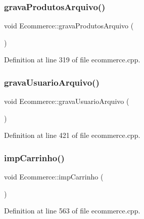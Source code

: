 \subsubsection{\texorpdfstring{grava\+Produtos\+Arquivo()}{gravaProdutosArquivo()}}
{\footnotesize\ttfamily void Ecommerce\+::grava\+Produtos\+Arquivo (\begin{DoxyParamCaption}{ }\end{DoxyParamCaption})}



Definition at line 319 of file ecommerce.\+cpp.

\mbox{\label{class_ecommerce_a5a0c013fa9ec62e5529e24286b8424cb}} 
\subsubsection{\texorpdfstring{grava\+Usuario\+Arquivo()}{gravaUsuarioArquivo()}}
{\footnotesize\ttfamily void Ecommerce\+::grava\+Usuario\+Arquivo (\begin{DoxyParamCaption}{ }\end{DoxyParamCaption})}



Definition at line 421 of file ecommerce.\+cpp.

\mbox{\label{class_ecommerce_a3b67b0883dbc411c4ff458d834ded408}} 
\subsubsection{\texorpdfstring{imp\+Carrinho()}{impCarrinho()}}
{\footnotesize\ttfamily void Ecommerce\+::imp\+Carrinho (\begin{DoxyParamCaption}{ }\end{DoxyParamCaption})}



Definition at line 563 of file ecommerce.\+cpp.

\mbox{\label{class_ecommerce_a7c17f28606f64a202842fa9bdfaf9667}} 
